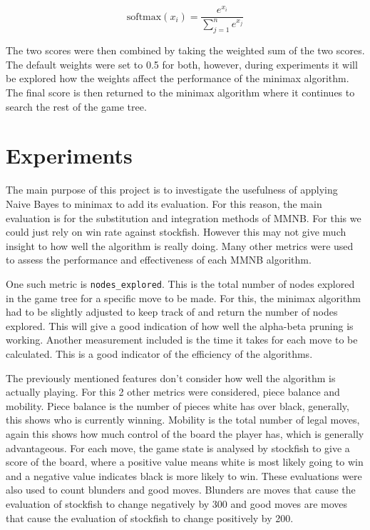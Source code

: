 \begin{equation}
    \label{eq:softmax}
    \text{softmax}(x_i) = \frac{e^{x_i}}{\sum_{j=1}^{n} e^{x_j}}
\end{equation}


The two scores were then combined by taking the weighted sum of the two scores. The default weights were set to 0.5 for both, however, during experiments it will be explored how the weights affect the performance of the minimax algorithm. The final score is then returned to the minimax algorithm where it continues to search the rest of the game tree.


\section{Experiments}

The main purpose of this project is to investigate the usefulness of applying Naive Bayes to minimax to add its evaluation. For this reason, the main evaluation is for the substitution and integration methods of MMNB. For this we could just rely on win rate against stockfish. However this may not give much insight to how well the algorithm is really doing. Many other metrics were used to assess the performance and effectiveness of each MMNB algorithm. 

One such metric is \texttt{nodes\_explored}. This is the total number of nodes explored in the game tree for a specific move to be made. For this, the minimax algorithm had to be slightly adjusted to keep track of and return the number of nodes explored. This will give a good indication of how well the alpha-beta pruning is working. Another measurement included is the time it takes for each move to be calculated. This is a good indicator of the efficiency of the algorithms. 

The previously mentioned features don't consider how well the algorithm is actually playing. For this 2 other metrics were considered, piece balance and mobility. Piece balance is the number of pieces white has over black, generally, this shows who is currently winning. Mobility is the total number of legal moves, again this shows how much control of the board the player has, which is generally advantageous. For each move, the game state is analysed by stockfish to give a score of the board, where a positive value means white is most likely going to win and a negative value indicates black is more likely to win. These evaluations were also used to count blunders and good moves. Blunders are moves that cause the evaluation of stockfish to change negatively by 300 and good moves are moves that cause the evaluation of stockfish to change positively by 200.  

